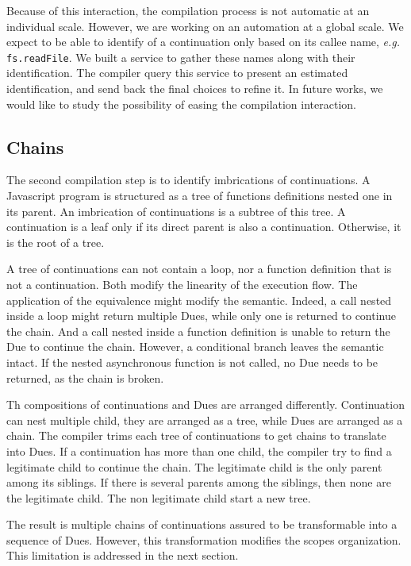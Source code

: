 Because of this interaction, the compilation process is not automatic at an individual scale.
However, we are working on an automation at a global scale.
We expect to be able to identify of a continuation only based on its callee name, \textit{e.g.} \texttt{fs.readFile}.
We built a service to gather these names along with their identification.
The compiler query this service to present an estimated identification, and send back the final choices to refine it.
In future works, we would like to study the possibility of easing the compilation interaction.

\subsection{Chains}

The second compilation step is to identify imbrications of continuations.
A Javascript program is structured as a tree of functions definitions nested one in its parent.
An imbrication of continuations is a subtree of this tree.
A continuation is a leaf only if its direct parent is also a continuation.
Otherwise, it is the root of a tree.

A tree of continuations can not contain a loop, nor a function definition that is not a continuation.
Both modify the linearity of the execution flow.
The application of the equivalence might modify the semantic.
Indeed, a call nested inside a loop might return multiple Dues, while only one is returned to continue the chain.
And a call nested inside a function definition is unable to return the Due to continue the chain.
However, a conditional branch leaves the semantic intact.
If the nested asynchronous function is not called, no Due needs to be returned, as the chain is broken.

Th compositions of continuations and Dues are arranged differently.
Continuation can nest multiple child, they are arranged as a tree, while Dues are arranged as a chain.
The compiler trims each tree of continuations to get chains to translate into Dues.
If a continuation has more than one child, the compiler try to find a legitimate child to continue the chain.
The legitimate child is the only parent among its siblings.
If there is several parents among the siblings, then none are the legitimate child.
The non legitimate child start a new tree.

The result is multiple chains of continuations assured to be transformable into a sequence of Dues.
However, this transformation modifies the scopes organization.
This limitation is addressed in the next section.

